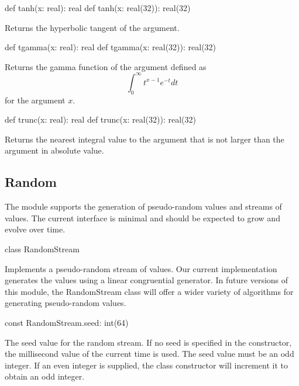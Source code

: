 \begin{protohead}
def tanh(x: real): real
def tanh(x: real(32)): real(32)
\end{protohead}
\begin{protobody}
Returns the hyperbolic tangent of the argument.
\end{protobody}

\begin{protohead}
def tgamma(x: real): real
def tgamma(x: real(32)): real(32)
\end{protohead}
\begin{protobody}
Returns the gamma function of the argument defined as
$$\int_0^\infty t^{x-1} e^{-t} dt$$
for the argument $x$.
\end{protobody}

\begin{protohead}
def trunc(x: real): real
def trunc(x: real(32)): real(32)
\end{protohead}
\begin{protobody}
Returns the nearest integral value to the argument that is not larger
than the argument in absolute value.
\end{protobody}

\subsection{Random}
\label{Random}

The module  supports the generation of pseudo-random
values and streams of values.  The current interface is minimal and
should be expected to grow and evolve over time.

\begin{protohead}
class RandomStream
\end{protohead}
\begin{protobody}
Implements a pseudo-random stream of values.  Our current
implementation generates the values using a linear congruential
generator.  In future versions of this module, the RandomStream class
will offer a wider variety of algorithms for generating pseudo-random
values.
\end{protobody}

\begin{protohead}
const RandomStream.seed: int(64)
\end{protohead}
\begin{protobody}
The seed value for the random stream.  If no seed is specified in the
constructor, the millisecond value of the current time is used.  The
seed value must be an odd integer.  If an even integer is supplied,
the class constructor will increment it to obtain an odd integer.
\end{protobody}


